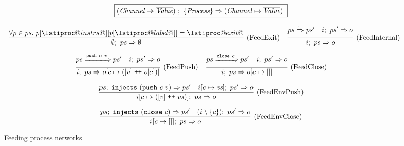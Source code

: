 
\begin{figure}

\newcommand\vs {\ti{vs}}
\newcommand\ps {\ti{ps}}

$$
  \boxed{
    (\textit{Channel} \mapsto \overline{\textit{Value}})~;~\{ \textit{Process} \} \Rightarrow (\textit{Channel} \mapsto \overline{\textit{Value}})~
  }
$$

$$
\ruleIN{
  \forall p \in ps.~
  p[\lstiproc@instrs@][p[\lstiproc@label@]] = \lstiproc@exit@
}{
  \ProcsFeed
    {\emptyset}
    {ps}
    {\emptyset}
}{FeedExit}
\ruleIN{
  \ProcsShake
    {ps}
    {\cdot}
    {ps'}
\quad
  \ProcsFeed{i}{ps'}{o}
}{
  \ProcsFeed
    {i}
    {ps}
    {o}
}{FeedInternal}
$$

$$
\enskip \frac {\displaystyle 
  ps \xRightarrow{\texttt{push}~c~v} ps'
\quad
  i;~ps' \Rightarrow o
} {\displaystyle 
  i;~ps \Rightarrow o[c \mapsto ([v] ~\texttt{++}~ o[c])]
} \  \mbox{(FeedPush)} \enskip
\enskip \frac {\displaystyle 
  ps \xRightarrow{\texttt{close}~c} ps'
\quad
  i;~ps' \Rightarrow o
} {\displaystyle 
  i;~ps \Rightarrow o[c \mapsto []]
} \  \mbox{(FeedClose)} \enskip
$$





$$
\ruleIN{
  \ProcsInject
    {ps}
    {(\Push~c~v)}
    {ps'}
\quad
  \ProcsFeed
    {i[c \mapsto \vs]}
    {ps'}
    {o}
}{
  \ProcsFeed
    {i[c \mapsto ([v] \listappend vs)]}
    {ps}
    {o}
}{FeedEnvPush}
$$

$$
\enskip \frac {\displaystyle 
  ps;~\texttt{injects}~(\texttt{close}~c) \Rightarrow ps'
\quad
  (i\setminus\{ c \});~ps' \Rightarrow o
} {\displaystyle 
  i[c \mapsto [] ];~ps \Rightarrow o
} \  \mbox{(FeedEnvClose)} \enskip
$$



\caption{Feeding process networks}
\label{fig:Process:Eval:Feed}
\end{figure}

